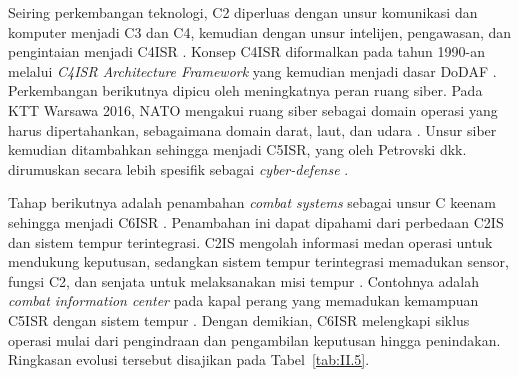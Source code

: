 Seiring perkembangan teknologi, C2 diperluas dengan unsur komunikasi dan komputer menjadi C3 dan C4, kemudian dengan unsur intelijen, pengawasan, dan pengintaian menjadi C4ISR \cite{Petrovski2023,Todorovic2025}. Konsep C4ISR diformalkan pada tahun 1990-an melalui \textit{C4ISR Architecture Framework} yang kemudian menjadi dasar DoDAF \cite{C4ISRAWG1998}. Perkembangan berikutnya dipicu oleh meningkatnya peran ruang siber. Pada KTT Warsawa 2016, NATO mengakui ruang siber sebagai domain operasi yang harus dipertahankan, sebagaimana domain darat, laut, dan udara \cite{NATO2016Warsaw}. Unsur siber kemudian ditambahkan sehingga menjadi C5ISR, yang oleh Petrovski dkk. dirumuskan secara lebih spesifik sebagai \textit{cyber-defense} \cite{Petrovski2023}.

Tahap berikutnya adalah penambahan \textit{combat systems} sebagai unsur C keenam sehingga menjadi C6ISR \cite{Petrovski2023}. Penambahan ini dapat dipahami dari perbedaan C2IS dan sistem tempur terintegrasi. C2IS mengolah informasi medan operasi untuk mendukung keputusan, sedangkan sistem tempur terintegrasi memadukan sensor, fungsi C2, dan senjata untuk melaksanakan misi tempur \cite{Todorovic2025}. Contohnya adalah \textit{combat information center} pada kapal perang yang memadukan kemampuan C5ISR dengan sistem tempur \cite{Petrovski2023}. Dengan demikian, C6ISR melengkapi siklus operasi mulai dari pengindraan dan pengambilan keputusan hingga penindakan. Ringkasan evolusi tersebut disajikan pada Tabel~\ref{tab:II.5}.

